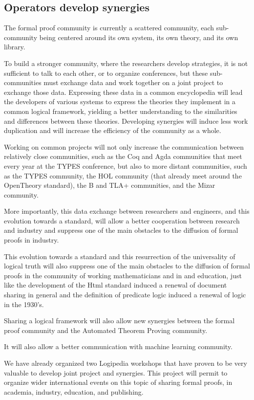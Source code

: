\subsection{Operators develop synergies}

The formal proof community is currently a scattered community, each
sub-community being centered around its own system, its own theory,
and its own library.

To build a stronger community, where the researchers develop
strategies, it is not sufficient to talk to each other, or to organize
conferences, but these sub-communities must exchange data and work
together on a joint project to exchange those data.
Expressing these data in a common encyclopedia will
lead the developers of various systems to express the theories they
implement in a common logical framework, yielding a better understanding
to the similarities and differences between these theories.
Developing synergies will induce less work duplication and will increase
the efficiency of the community as a whole.

Working on common projects will not only increase the communication
between relatively close communities, such as the Coq and 
  Agda communities that meet every year at the TYPES conference, but
also to more distant communities, such as the TYPES community, the HOL
community (that already meet around the OpenTheory standard),
the B and TLA+ communities, and the Mizar community.

More importantly, this data exchange between researchers and
engineers, and this evolution towards a standard, will allow a better
cooperation between research and industry and suppress one of the main
obstacles to the diffusion of formal proofs in industry.

This evolution towards a standard and this resurrection of the
universality of logical truth will also suppress one of the main
obstacles to the diffusion of formal proofs in the community of
working mathematicians and in and education, just like the development
of the Html standard induced a renewal of document sharing in general
and the definition of predicate logic induced a renewal of logic in
the 1930's.

Sharing a logical framework will also allow new synergies between 
the formal proof community and the Automated Theorem Proving community.

It will also allow a better communication with machine learning community.

We have already organized two Logipedia workshops that have proven to
be very valuable to develop joint project and synergies.  This project
will permit to organize wider international events on this topic of
sharing formal proofs, in academia, industry, education, and
publishing.

